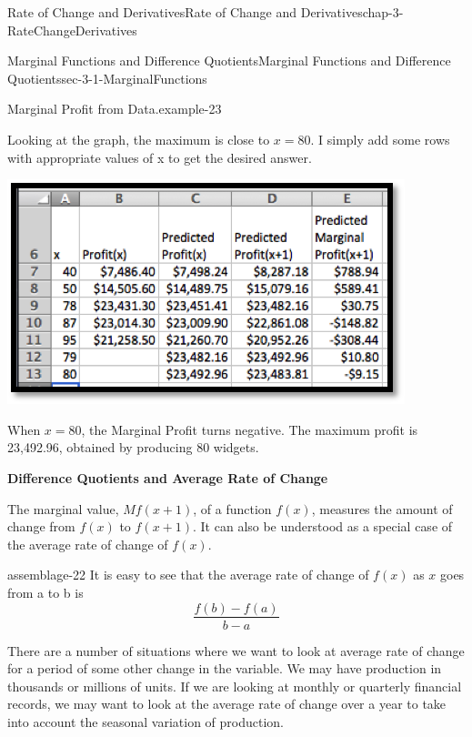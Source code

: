 \documentclass[oneside,10pt,]{book}
\newcommand{\terminology}[1]{\textbf{#1}}
\numberwithin{equation}{section}
\begin{document}
\begin{chapterptx}{Rate of Change and Derivatives}{}{Rate of Change and Derivatives}{}{}{chap-3-RateChangeDerivatives}
\begin{sectionptx}{Marginal Functions and Difference Quotients}{}{Marginal Functions and Difference Quotients}{}{}{sec-3-1-MarginalFunctions}
\begin{example}{Marginal Profit from Data.}{example-23}
\begin{sidebyside}{1}{0}{0}{0}
\begin{sbspanel}{1}
\end{sbspanel}%
\end{sidebyside}%
\par
\hypertarget{p-927}{}%
Looking at the graph, the maximum is close to \(x=80\).  I simply add some rows with appropriate values of x to get the desired answer.%
\begin{sidebyside}{1}{0.25}{0.25}{0}%
\begin{sbspanel}{0.5}%
\includegraphics[width=1\linewidth]{images/sec3-1-9.png}
\end{sbspanel}%
\end{sidebyside}%
\par
\hypertarget{p-928}{}%
When \(x = 80\), the Marginal Profit turns negative.  The maximum profit is \textdollar{}23,492.96, obtained by producing 80 widgets.%
\end{example}
\hypertarget{p-929}{}%
\terminology{Difference Quotients and Average Rate of Change}%
\par
\hypertarget{p-930}{}%
The marginal value, \(Mf(x+1)\), of a function \(f(x)\), measures the amount of change from \(f(x)\) to \(f(x+1)\).  It can also be understood as a special case of the average rate of change of \(f(x)\).%
\begin{assemblage}{}{assemblage-22}%
\hypertarget{p-931}{}%
It is easy to see that the average rate of change of \(f(x)\)  as \(x\) goes from a to b is%
\begin{equation*}
\frac{f(b)-f(a)}{b-a}
\end{equation*}
%
\end{assemblage}
\hypertarget{p-932}{}%
There are a number of situations where we want to look at average rate of change for a period of some other change in the variable.  We may have production in thousands or millions of units.  If we are looking at monthly or quarterly financial records, we may want to look at the average rate of change over a year to take into account the seasonal variation of production.%

\end{sectionptx}
\end{chapterptx}
\end{document}
